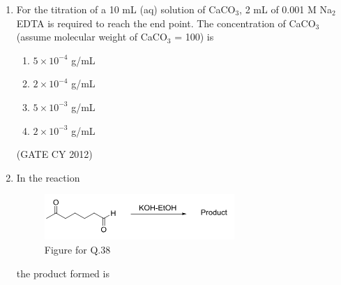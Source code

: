 \documentclass[12pt]{article}
\begin{document}
\begin{enumerate}
\item For the titration of a 10 mL (aq) solution of CaCO$_3$, 2 mL of 0.001 M Na$_2$EDTA is required to reach the end point.  
The concentration of CaCO$_3$ (assume molecular weight of CaCO$_3$ = 100) is  

\begin{multicols}{2}
\begin{enumerate}
    \item $5 \times 10^{-4}$ g/mL
    \item $2 \times 10^{-4}$ g/mL
    \item $5 \times 10^{-3}$ g/mL
    \item $2 \times 10^{-3}$ g/mL
\end{enumerate}
\end{multicols}
\hfill (GATE CY 2012)

\item In the reaction  

\begin{figure}[H]
    \centering
    \includegraphics[width=0.55\columnwidth]{figs/q38.png}
    \caption{Figure for Q.38}
    \label{fig:q38}
\end{figure}

the product formed is  


\end{enumerate}
\end{document}

